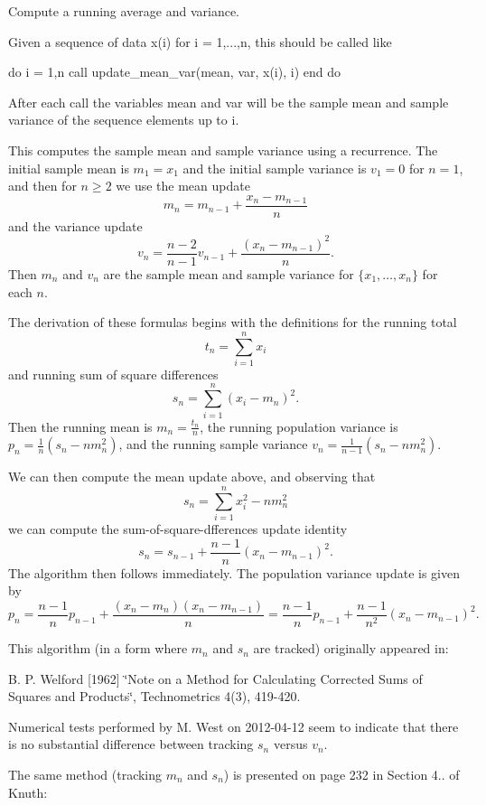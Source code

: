 Compute a running average and variance. 

Given a sequence of data {\ttfamily x(i)} for {\ttfamily i = 1,...,n}, this should be called like 
\begin{DoxyPre}
 do i = 1,n
   call update\_mean\_var(mean, var, x(i), i)
 end do
 \end{DoxyPre}
 After each call the variables {\ttfamily mean} and {\ttfamily var} will be the sample mean and sample variance of the sequence elements up to {\ttfamily i}.

This computes the sample mean and sample variance using a recurrence. The initial sample mean is $m_1 = x_1$ and the initial sample variance is $v_1 = 0$ for $n = 1$, and then for $n \ge 2$ we use the mean update \[ m_n = m_{n-1} + \frac{x_n - m_{n-1}}{n} \] and the variance update \[ v_n = \frac{n - 2}{n - 1} v_{n-1} + \frac{(x_n - m_{n-1})^2}{n}. \] Then $m_n$ and $v_n$ are the sample mean and sample variance for $\{x_1,\ldots,x_n\}$ for each $n$.

The derivation of these formulas begins with the definitions for the running total \[ t_n = \sum_{i=1}^n x_i \] and running sum of square differences \[ s_n = \sum_{i=1}^n (x_i - m_n)^2. \] Then the running mean is $m_n = \frac{t_n}{n}$, the running population variance is $p_n = \frac{1}{n} \left( s_n - n m_n^2 \right)$, and the running sample variance $v_n = \frac{1}{n - 1} \left( s_n - n m_n^2 \right)$.

We can then compute the mean update above, and observing that \[ s_n = \sum_{i=1}^n x_i^2 - n m_n^2 \] we can compute the sum-\/of-\/square-\/dfferences update identity \[ s_n = s_{n-1} + \frac{n - 1}{n} (x_n - m_{n-1})^2. \] The algorithm then follows immediately. The population variance update is given by \[ p_n = \frac{n-1}{n} p_{n-1} + \frac{(x_n - m_n)(x_n - m_{n-1})}{n} = \frac{n-1}{n} p_{n-1} + \frac{n-1}{n^2} (x_n - m_{n-1})^2. \]

This algorithm (in a form where $m_n$ and $s_n$ are tracked) originally appeared in\+:

B. P. Welford \mbox{[}1962\mbox{]} \char`\"{}\+Note on a Method for Calculating Corrected
 Sums of Squares and Products\char`\"{}, Technometrics 4(3), 419-\/420.

Numerical tests performed by M. West on 2012-\/04-\/12 seem to indicate that there is no substantial difference between tracking $s_n$ versus $v_n$.

The same method (tracking $m_n$ and $s_n$) is presented on page 232 in Section 4.. of Knuth\+:

